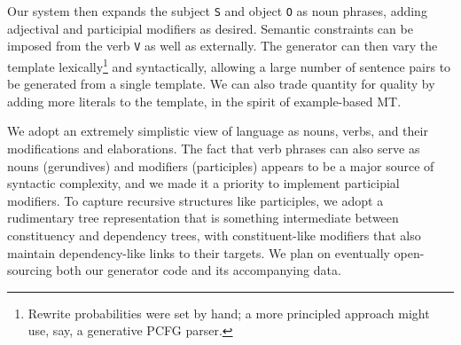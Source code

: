 \noindent Our system then expands the subject {\small \tt S} and object {\small \tt O} as noun phrases, adding adjectival and participial modifiers as desired. 
Semantic constraints can be imposed from the verb {\small \tt V} as well as externally.
The generator can then vary the template lexically\footnote{
    Rewrite probabilities were set by hand; a more principled approach might use, say, a generative PCFG parser.} and syntactically, allowing a large number of sentence pairs to be generated from a single template.
We can also trade quantity for quality by adding more literals to the template, in the spirit of example-based MT.


We adopt an extremely simplistic view of language as nouns, verbs, and their modifications and elaborations.
The fact that verb phrases can also serve as nouns (gerundives) and modifiers (participles) appears to be a major source of syntactic complexity, and we made it a priority to implement participial modifiers.
To capture recursive structures like participles, we adopt a rudimentary tree representation that is something intermediate between constituency and dependency trees, with constituent-like modifiers that also maintain dependency-like links to their targets.
We plan on eventually open-sourcing both our generator code and its accompanying data.




